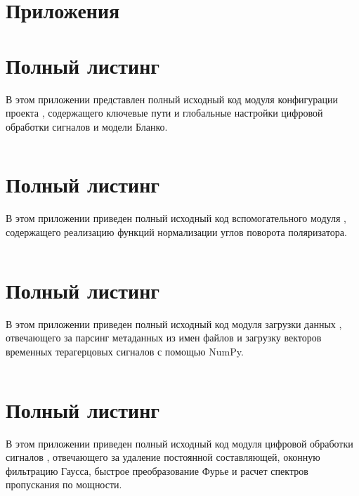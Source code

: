 \section*{Приложения}
\appendix

\section[Полный листинг config.py]{Полный листинг } \label{app:config}
В этом приложении представлен полный исходный код модуля конфигурации проекта , содержащего ключевые пути и глобальные настройки цифровой обработки сигналов и модели Бланко.

\inputminted{python}{../src/config.py}

\section[Полный листинг utils.py]{Полный листинг } \label{app:utils}
В этом приложении приведен полный исходный код вспомогательного модуля , содержащего реализацию функций нормализации углов поворота поляризатора.

\inputminted{python}{../src/utils.py}

\section[Полный листинг data\_loader.py]{Полный листинг } \label{app:data_loader}
В этом приложении приведен полный исходный код модуля загрузки данных , отвечающего за парсинг метаданных из имен файлов и загрузку векторов временных терагерцовых сигналов с помощью NumPy.

\inputminted{python}{../src/data_loader.py}

\section[Полный листинг spectrum.py]{Полный листинг } \label{app:spectrum}
В этом приложении приведен полный исходный код модуля цифровой обработки сигналов , отвечающего за удаление постоянной составляющей, оконную фильтрацию Гаусса, быстрое преобразование Фурье и расчет спектров пропускания по мощности.

\inputminted{python}{../src/spectrum.py}


